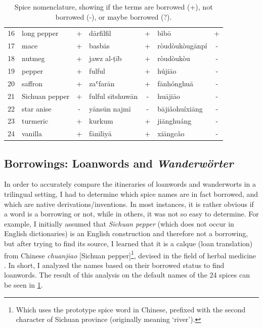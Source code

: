 \begin{table}[h]
\begin{tabular}{@{}rlclclc@{}}
    16          & long pepper      & +           & dārfilfil        & +           & bìbō             & +           \\
    17          & mace             & +           & basbās           & +           & ròudòukòugānpí   & -           \\
    18          & nutmeg           & +           & jawz al-ṭīb      & +           & ròudòukòu        & -           \\
    19          & pepper           & +           & fulful           & +           & hújiāo           & -           \\
    20          & saffron          & +           & zaʿfarān         & +           & fānhónghuā       & -           \\
    21          & Sichuan pepper   & +           & fulful sītshuwān & -           & huā​jiāo         & -           \\
    22          & star anise       & -           & yānsūn najmī     & -           & bājiǎohuíxiāng   & -           \\
    23          & turmeric         & +           & kurkum           & +           & jiānghuáng       & -           \\
    24          & vanilla          & +           & fānīliyā         & +           & xiāngcǎo         & -           \\ \bottomrule
    \end{tabular}
    \caption[Spice nomenclature, showing if the terms are borrowed or not.]{Spice nomenclature, showing if the terms are borrowed (+), not borrowed (-), or maybe borrowed (?).}
    \label{table:borrowings}
    \end{table}



\subsection{Borrowings: Loanwords and \textit{Wanderwörter}}

In order to accurately compare the itineraries of loanwords and \glspl{wanderwort} in a trilingual setting, I had to determine which spice names are in fact borrowed, and which are native derivations/inventions. In most instances, it is rather obvious if a word is a borrowing or not, while in others, it was not so easy to determine. For example, I initially assumed that \textit{Sichuan pepper} (which does not occur in English dictionaries) is an English construction and therefore not a borrowing, but after trying to find its source, I learned that it is a calque (loan translation) from Chinese  \textit{chuanjiao} [Sichuan pepper]\footnote{Which uses the prototype spice word in Chinese, prefixed with the second character of Sichuan province (originally meaning `river').}, devised in the field of herbal medicine \autocite[140]{hooper_chinese_1929}. In short, I analyzed the names based on their borrowed status to find loanwords. The result of this analysis on the default names of the 24 spices can be seen in \cref{table:borrowings}.

